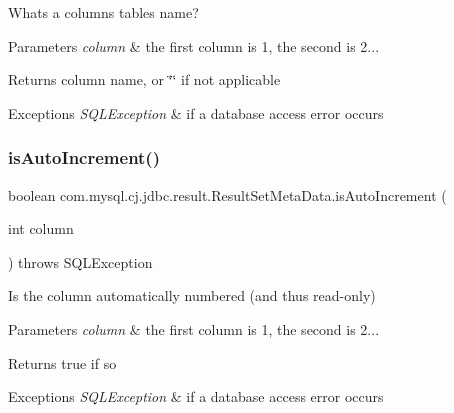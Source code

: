 Whats a column\textquotesingle{}s table\textquotesingle{}s name?


\begin{DoxyParams}{Parameters}
{\em column} & the first column is 1, the second is 2...\\
\hline
\end{DoxyParams}
\begin{DoxyReturn}{Returns}
column name, or \char`\"{}\char`\"{} if not applicable
\end{DoxyReturn}

\begin{DoxyExceptions}{Exceptions}
{\em S\+Q\+L\+Exception} & if a database access error occurs \\
\hline
\end{DoxyExceptions}
\mbox{\label{classcom_1_1mysql_1_1cj_1_1jdbc_1_1result_1_1_result_set_meta_data_a9983a9e7e92e9e9fcbe77ff2f142fdf3}} 
\subsubsection{\texorpdfstring{is\+Auto\+Increment()}{isAutoIncrement()}}
{\footnotesize\ttfamily boolean com.\+mysql.\+cj.\+jdbc.\+result.\+Result\+Set\+Meta\+Data.\+is\+Auto\+Increment (\begin{DoxyParamCaption}\item[{int}]{column }\end{DoxyParamCaption}) throws S\+Q\+L\+Exception}

Is the column automatically numbered (and thus read-\/only)


\begin{DoxyParams}{Parameters}
{\em column} & the first column is 1, the second is 2...\\
\hline
\end{DoxyParams}
\begin{DoxyReturn}{Returns}
true if so
\end{DoxyReturn}

\begin{DoxyExceptions}{Exceptions}
{\em S\+Q\+L\+Exception} & if a database access error occurs \\
\hline
\end{DoxyExceptions}
\mbox{\label{classcom_1_1mysql_1_1cj_1_1jdbc_1_1result_1_1_result_set_meta_data_a100a9826a3a772fc38490ed65d08306d}} 
